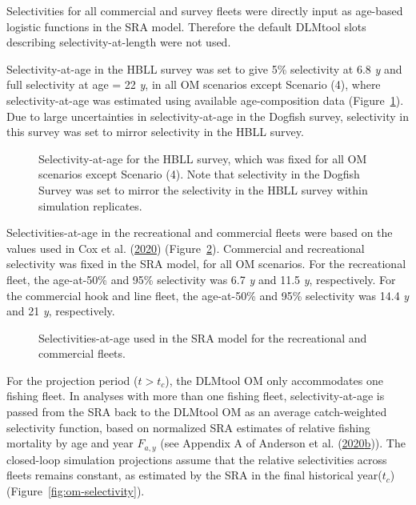 \documentclass[11pt]{book}
\begin{document}
Selectivities for all commercial and survey fleets were directly input as age-based logistic functions in the SRA model. Therefore the default DLMtool slots describing selectivity-at-length were not used.

Selectivity-at-age in the HBLL survey was set to give 5\% selectivity at 6.8 \emph{y} and full selectivity at age = 22 \emph{y}, in all OM scenarios except Scenario (4), where selectivity-at-age was estimated using available age-composition data (Figure~\ref{fig:HBLL-selectivity}). Due to large uncertainties in selectivity-at-age in the Dogfish survey, selectivity in this survey was set to mirror selectivity in the HBLL survey.


\begin{figure}[htb]

{\centering {} 

}

\caption{Selectivity-at-age for the HBLL survey, which was fixed for all OM scenarios except Scenario (4). Note that selectivity in the Dogfish Survey was set to mirror the selectivity in the HBLL survey within simulation replicates.}\label{fig:HBLL-selectivity}
\end{figure}
Selectivities-at-age in the recreational and commercial fleets were based on the values used in Cox et al. (\protect\hyperlink{ref-cox2020}{2020}) (Figure~\ref{fig:sra-selectivity}). Commercial and recreational selectivity was fixed in the SRA model, for all OM scenarios. For the recreational fleet, the age-at-50\% and 95\% selectivity was 6.7 \emph{y} and 11.5 \emph{y}, respectively. For the commercial hook and line fleet, the age-at-50\% and 95\% selectivity was 14.4 \emph{y} and 21 \emph{y}, respectively.


\begin{figure}[htb]

{\centering {} 

}

\caption{Selectivities-at-age used in the SRA model for the recreational and commercial fleets.}\label{fig:sra-selectivity}
\end{figure}
For the projection period (\(t > t_c\)), the DLMtool OM only accommodates one fishing fleet. In analyses with more than one fishing fleet, selectivity-at-age is passed from the SRA back to the DLMtool OM as an average catch-weighted selectivity function, based on normalized SRA estimates of relative fishing mortality by age and year \(F_{a,y}\) (see Appendix A of Anderson et al. (\protect\hyperlink{ref-anderson2020gfmp}{2020}\protect\hyperlink{ref-anderson2020gfmp}{b})). The closed-loop simulation projections assume that the relative selectivities across fleets remains constant, as estimated by the SRA in the final historical year(\(t_c\)) (Figure~\ref{fig:om-selectivity}).
\end{document}
